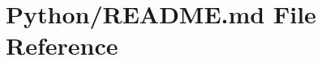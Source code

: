\hypertarget{Python_2README_8md}{}\section{Python/\+R\+E\+A\+D\+ME.md File Reference}
\label{Python_2README_8md}
